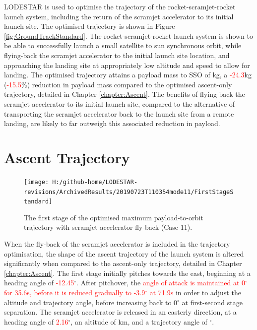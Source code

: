 LODESTAR is used to optimise the trajectory of the rocket-scramjet-rocket launch system, including the return of the scramjet accelerator to its initial launch site. The optimised trajectory is shown in Figure \ref{fig:GroundTrackStandard}. 
The rocket-scramjet-rocket launch system is shown to be able to successfully launch a small satellite to sun synchronous orbit, 
while flying-back the scramjet accelerator to the initial launch site location, and approaching the landing site at appropriately low altitude and speed to allow for landing. 
The optimised trajectory attains a payload mass to SSO of \PayloadToOrbitStandard kg, a \textcolor{red}{-24.3}kg (\textcolor{red}{-15.5}\%) reduction in payload mass compared to the optimised ascent-only trajectory, detailed in Chapter \ref{chapter:Ascent}. 
The benefits of flying back the scramjet accelerator to its initial launch site, compared to the alternative of transporting the scramjet accelerator back to the launch site from a remote landing, are likely to far outweigh this associated reduction in payload. 



\section{Ascent Trajectory}

\begin{figure}[ht]%
	\centering
	\texttt{[image: H:/github-home/LODESTAR-revisions/ArchivedResults/20190723T110354mode11/FirstStageStandard]}
	\caption{The first stage of the optimised maximum payload-to-orbit trajectory with scramjet accelerator fly-back (Case 11). }
	\label{fig:FirstStageStandard}
\end{figure}
When the fly-back of the scramjet accelerator is included in the trajectory optimisation, the shape of the ascent trajectory of the launch system is altered significantly when compared to the ascent-only trajectory, detailed in Chapter \ref{chapter:Ascent}.
 The first stage initially pitches towards the east, beginning at a heading angle of \textcolor{red}{-12.45}$^\circ$.
 After pitchover, the \textcolor{red}{angle of attack is maintained at 0$^\circ$ for 35.6s, before it is reduced gradually to -3.9$^\circ$ at 71.9s} in order to adjust the altitude and trajectory angle, before increasing back to 0$^\circ$ at first-second stage separation. 
 The scramjet accelerator is released in an easterly direction, at a heading angle of \textcolor{red}{2.16}$^\circ$, an altitude of \firstsecondSeparationAltStandard km, and a trajectory angle of \firstsecondSeparationgammaStandard $^\circ$. 
 
